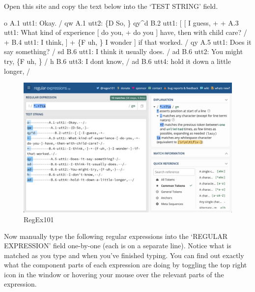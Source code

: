 \documentclass[
  letterpaper,
]{scrbook}
\newenvironment{Shaded}{\begin{snugshade}}{\end{snugshade}}
\newcommand{\NormalTok}[1]{\textcolor[rgb]{0.00,0.00,0.00}{#1}}
\begin{document}
Open this site and copy the text below into the `TEST STRING' field.

\begin{Shaded}
\begin{Highlighting}[]
\NormalTok{o          A.1 utt1: Okay.  /}
\NormalTok{qw          A.1 utt2: \{D So, \}}
\NormalTok{qy\^{}d          B.2 utt1: [ [ I guess, +}
\NormalTok{+          A.3 utt1: What kind of experience [ do you, + do you ] have, then with child care? /}
\NormalTok{+          B.4 utt1: I think, ] + \{F uh, \} I wonder ] if that worked. /}
\NormalTok{qy          A.5 utt1: Does it say something? /}
\NormalTok{sd          B.6 utt1: I think it usually does.  /}
\NormalTok{ad          B.6 utt2: You might try, \{F uh, \}  /}
\NormalTok{h          B.6 utt3: I don\textquotesingle{}t know,  /}
\NormalTok{ad          B.6 utt4: hold it down a little longer,  /}
\end{Highlighting}
\end{Shaded}

\begin{figure}[h]

{\centering \includegraphics[width=6.39in,height=\textheight]{./figures/curate-datasets/cd-regex-101.png}

}

\caption{\label{fig-cd-regex-101-image}RegEx101}

\end{figure}

Now manually type the following regular expressions into the `REGULAR
EXPRESSION' field one-by-one (each is on a separate line). Notice what
is matched as you type and when you've finished typing. You can find out
exactly what the component parts of each expression are doing by
toggling the top right icon in the window or hovering your mouse over
the relevant parts of the expression.
\end{document}
